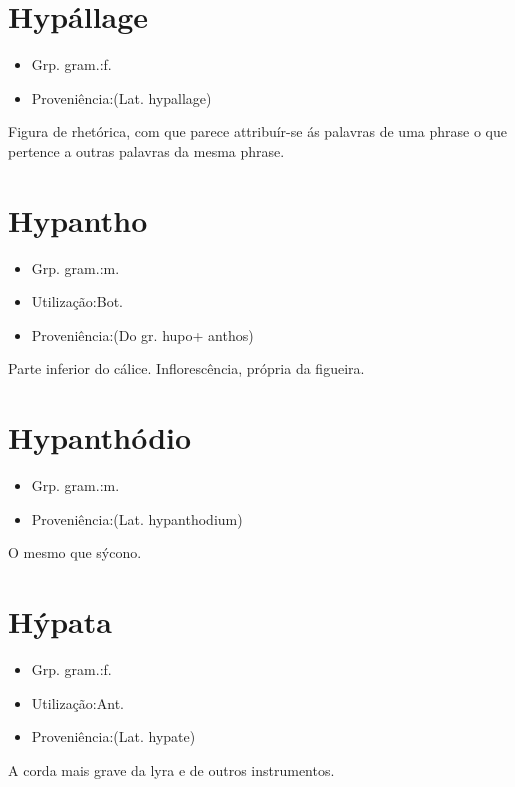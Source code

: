 \documentclass{article}
\begin{document}
\section{Hypállage}
\begin{itemize}
\item {Grp. gram.:f.}
\end{itemize}
\begin{itemize}
\item {Proveniência:(Lat. \textunderscore hypallage\textunderscore )}
\end{itemize}
Figura de rhetórica, com que parece attribuír-se ás palavras de uma phrase o que pertence a outras palavras da mesma phrase.
\section{Hypantho}
\begin{itemize}
\item {Grp. gram.:m.}
\end{itemize}
\begin{itemize}
\item {Utilização:Bot.}
\end{itemize}
\begin{itemize}
\item {Proveniência:(Do gr. \textunderscore hupo\textunderscore  + \textunderscore anthos\textunderscore )}
\end{itemize}
Parte inferior do cálice.
Inflorescência, própria da figueira.
\section{Hypanthódio}
\begin{itemize}
\item {Grp. gram.:m.}
\end{itemize}
\begin{itemize}
\item {Proveniência:(Lat. \textunderscore hypanthodium\textunderscore )}
\end{itemize}
O mesmo que \textunderscore sýcono\textunderscore .
\section{Hýpata}
\begin{itemize}
\item {Grp. gram.:f.}
\end{itemize}
\begin{itemize}
\item {Utilização:Ant.}
\end{itemize}
\begin{itemize}
\item {Proveniência:(Lat. \textunderscore hypate\textunderscore )}
\end{itemize}
A corda mais grave da lyra e de outros instrumentos.
\end{document}
